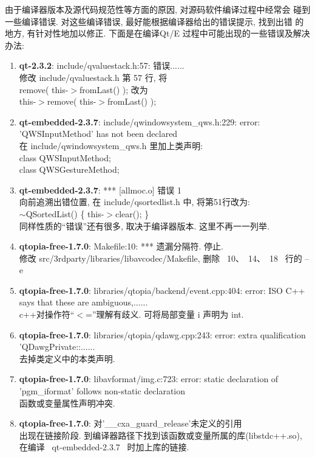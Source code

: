 	由于编译器版本及源代码规范性等方面的原因, 对源码软件编译过程中经常会
碰到一些编译错误. 对这些编译错误, 最好能根据编译器给出的错误提示, 找到出错
的地方, 有针对性地加以修正. 下面是在编译Qt/E 过程中可能出现的一些错误及解决
办法:
\begin{enumerate}\itemsep=-3pt
  \item {\bf qt-2.3.2}: include/qvaluestack.h:57: 错误......\\
		修改 include/qvaluestack.h 第 57 行, 将\\
		remove( this-$>$fromLast() ); 改为\\
		this-$>$remove( this-$>$fromLast() );
  \item {\bf qt-embedded-2.3.7}: include/qwindowsystem\_qws.h:229: error:
		'QWSInputMethod' has not been declared\\
		在 include/qwindowsystem\_qws.h 里加上类声明:\\
		class   QWSInputMethod;\\
		class   QWSGestureMethod;
  \item {\bf qt-embedded-2.3.7}: *** [allmoc.o] 错误 1\\
		向前追溯出错位置, 在 include/qsortedlist.h 中, 将第51行改为:\\
		$\sim$QSortedList() \{ this-$>$clear(); \}\\
		同样性质的``错误''还有很多, 取决于编译器版本. 这里不再一一列举.
  \item {\bf qtopia-free-1.7.0}: Makefile:10: *** 遗漏分隔符. 停止.\\
		修改 src/3rdparty/libraries/libavcodec/Makefile, 删除 ~10、~14、~18~
		行的 --e
  \item {\bf qtopia-free-1.7.0}: libraries/qtopia/backend/event.cpp:404:
		error: ISO C++ says that these are ambiguous,......\\
		c++对操作符``$<$=''理解有歧义. 可将局部变量 i 声明为 int.
  \item {\bf qtopia-free-1.7.0}: libraries/qtopia/qdawg.cpp:243: error:
		extra qualification 'QDawgPrivate::......\\
		去掉类定义中的本类声明.
  \item {\bf qtopia-free-1.7.0}: libavformat/img.c:723: error: static
		declaration of 'pgm\_iformat' follows non-static declaration\\
		函数或变量属性声明冲突.
  \item {\bf qtopia-free-1.7.0}: 对'\_\_cxa\_guard\_release'未定义的引用\\
		出现在链接阶段. 到编译器路径下找到该函数或变量所属的库(libstdc++.so),
		在编译 ~qt-embedded-2.3.7~ 时加上库的链接.
\end{enumerate}
\rm\normalsize
